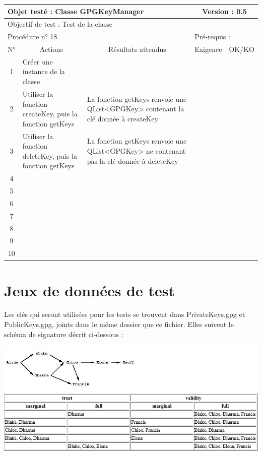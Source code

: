 \documentclass{../res/univ-projet}
\begin{document}
\begin{center}
    \begin{tabular}{|c|p{5cm}|p{5cm}|p{1.5cm}|p{1.5cm}|}
      \hline
      \multicolumn{3}{|l|}{Objet testé : Classe GPGKeyManager} & \multicolumn{2}{c|}{Version : 0.5}\\ \hline
      \multicolumn{5}{|l|}{Objectif de test : Test de la classe}\\ \hline
      \multicolumn{3}{|l|}{Procédure n° 18} & \multicolumn{2}{p{3cm}|}{Pré-requis : }\\ \hline
      \multicolumn{1}{|c|}{N°} & \multicolumn{1}{c|}{Actions} & \multicolumn{1}{c|}{Résultats attendus} & 
      \multicolumn{1}{c|}{Exigence} & \multicolumn{1}{c|}{OK/KO}\\ \hline
      1 & Créer une instance de la classe &  &  & \\
      2 & Utiliser la fonction createKey, puis la fonction getKeys & La fonction getKeys renvoie une QList<GPGKey> contenant la clé donnée à createKey &  & \\
      3 & Utiliser la fonction deleteKey, puis la fonction getKeys  & La fonction getKeys renvoie une QList<GPGKey> ne contenant pas la clé donnée à deleteKey &  & \\
      4 &  &  &  & \\
      5 &  &  &  & \\
	  6 &  &  &  & \\
      7 &  &  &  & \\
      8 &  &  &  & \\
      9 &  &  &  & \\
      10 &  &  &  &\\ 
	\hline
    \end{tabular}
    \vskip 2.2cm
	
	

\end{center}

\section{Jeux de données de test}

Les clés qui seront utilisées pour les tests se trouvent dans PrivateKeys.gpg et PublicKeys.gpg, joints dans le même dossier que ce fichier.
Elles suivent le schéma de signature décrit ci-dessous :

\includegraphics[scale=0.80]{graphics/trust_example.png}
\end{document}

